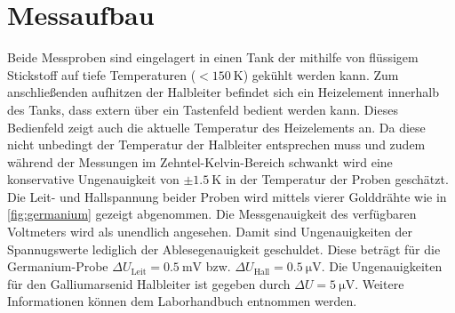 
\section{Messaufbau}
\label{sec:setup}

Beide Messproben sind eingelagert in einen Tank der mithilfe von flüssigem Stickstoff
auf tiefe Temperaturen ($<\SI{150}{\kelvin}$) gekühlt werden kann. Zum anschließenden
aufhitzen der Halbleiter befindet sich ein Heizelement innerhalb des Tanks, dass 
extern über ein Tastenfeld bedient werden kann. Dieses Bedienfeld zeigt auch die 
aktuelle Temperatur des Heizelements an. Da diese nicht unbedingt der Temperatur der
Halbleiter entsprechen muss und zudem während der Messungen im Zehntel-Kelvin-Bereich
schwankt wird eine konservative Ungenauigkeit von $\pm\SI{1.5}{\kelvin}$ in der 
Temperatur der Proben geschätzt. Die Leit- und Hallspannung beider Proben wird
mittels vierer Golddrähte wie in \autoref{fig:germanium} gezeigt abgenommen. Die 
Messgenauigkeit des verfügbaren Voltmeters wird als unendlich angesehen. Damit sind 
Ungenauigkeiten der Spannugswerte lediglich der Ablesegenauigkeit geschuldet. Diese
beträgt für die Germanium-Probe $\Delta U_\text{Leit} = \SI{0.5}{\milli\volt}$ bzw.
$\Delta U_\text{Hall} = \SI{0.5}{\micro\volt}$. Die Ungenauigkeiten für den 
Galliumarsenid Halbleiter ist gegeben durch $\Delta U=\SI{5}{\micro\volt}$. Weitere
Informationen können dem Laborhandbuch \cite{Manual} entnommen werden.

